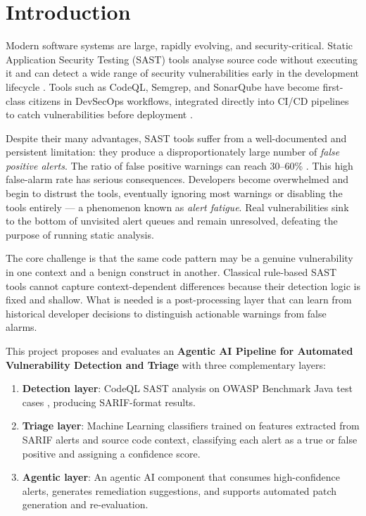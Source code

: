 \chapter{Introduction}
\label{ch:introduction}

Modern software systems are large, rapidly evolving, and security-critical.
Static Application Security Testing (SAST) tools analyse source code without
executing it and can detect a wide range of security vulnerabilities early in
the development lifecycle \cite{habib2022sca}. Tools such as CodeQL, Semgrep,
and SonarQube have become first-class citizens in DevSecOps workflows, integrated
directly into CI/CD pipelines to catch vulnerabilities before deployment \cite{githubseclab2023codeql}.

Despite their many advantages, SAST tools suffer from a well-documented and
persistent limitation: they produce a disproportionately large number of
\emph{false positive alerts}. The ratio of false positive warnings can reach
30--60\% \cite{habib2022sca}. This high false-alarm rate has serious
consequences. Developers become overwhelmed and begin to distrust the tools,
eventually ignoring most warnings or disabling the tools entirely --- a
phenomenon known as \emph{alert fatigue}. Real vulnerabilities sink to the
bottom of unvisited alert queues and remain unresolved, defeating the purpose
of running static analysis.

The core challenge is that the same code pattern may be a genuine vulnerability
in one context and a benign construct in another. Classical rule-based SAST tools
cannot capture context-dependent differences because their detection logic is
fixed and shallow. What is needed is a post-processing layer that can learn from
historical developer decisions to distinguish actionable warnings from false alarms.

This project proposes and evaluates an \textbf{Agentic AI Pipeline for Automated
Vulnerability Detection and Triage} with three complementary layers:

\begin{enumerate}
  \item \textbf{Detection layer}: CodeQL SAST analysis on OWASP Benchmark Java
        test cases \cite{owasp2023benchmark}, producing SARIF-format results.
  \item \textbf{Triage layer}: Machine Learning classifiers trained on features
        extracted from SARIF alerts and source code context, classifying each
        alert as a true or false positive and assigning a confidence score.
  \item \textbf{Agentic layer}: An agentic AI component that consumes
        high-confidence alerts, generates remediation suggestions, and supports
        automated patch generation and re-evaluation.
\end{enumerate}

